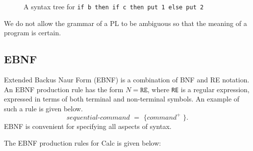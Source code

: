 \documentclass[a4paper, openany]{memoir}
\begin{document}
\begin{figure}[H]
    \centering
    \caption{A syntax tree for \texttt{if b then if c then put 1 else put 2}}
\end{figure}
We do not allow the grammar of a PL to be ambiguous so that the meaning of a program is certain.

\subsection{EBNF}
Extended Backus Naur Form (EBNF) is a combination of BNF and RE notation. An EBNF production rule has the form $N = \texttt{RE}$, where \texttt{RE} is a regular expression, expressed in terms of both terminal and non-terminal symbols. An example of such a rule is given below.
\[\textit{sequential-command } = \texttt{ \{ } \textit{command}^{\texttt{+}} \texttt{ \}}.\]
EBNF is convenient for specifying all aspects of syntax.

The EBNF production rules for Calc is given below:
\end{document}
